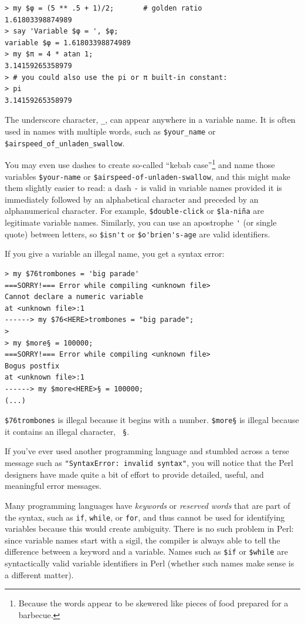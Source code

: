 \begin{verbatim}
> my $φ = (5 ** .5 + 1)/2;       # golden ratio
1.61803398874989
> say 'Variable $φ = ', $φ;
variable $φ = 1.61803398874989
> my $π = 4 * atan 1; 
3.14159265358979
> # you could also use the pi or π built-in constant:
> pi
3.14159265358979
\end{verbatim}

The underscore character, \verb"_", can appear anywhere in a variable name.
It is often used in names with multiple words, such as 
\verb"$your_name" or \verb"$airspeed_of_unladen_swallow". 

You may even use dashes to create so-called 
``kebab case''\footnote{Because the 
words appear to be skewered like pieces of food prepared for 
a barbecue.} and name those variables 
\verb"$your-name" or \verb"$airspeed-of-unladen-swallow", and this 
might make them slightly easier to read: a dash \verb'-' is 
valid in variable names provided it is immediately followed by an 
alphabetical character and preceded by an alphanumerical character. 
For example, \verb"$double-click" or \verb"$la-niña" are legitimate 
variable names. Similarly, you can use an apostrophe \verb"'" (or single 
quote) between letters, so \verb"$isn't" or \verb"$o'brien's-age" 
are valid identifiers.


If you give a variable an illegal name, you get a syntax error:

\begin{verbatim}
> my $76trombones = 'big parade'
===SORRY!=== Error while compiling <unknown file>
Cannot declare a numeric variable
at <unknown file>:1
------> my $76<HERE>trombones = "big parade";
>
> my $more§ = 100000;
===SORRY!=== Error while compiling <unknown file>
Bogus postfix
at <unknown file>:1
------> my $more<HERE>§ = 100000;
(...)
\end{verbatim}
%
{\tt \$76trombones} is illegal because it begins with a number.
{\tt \$more§} is illegal because it contains an illegal character, {\tt
§}. 

If you've ever used another programming language and stumbled 
across a terse message such as {\tt"SyntaxError: invalid syntax"}, 
you will notice that the Perl designers have made quite a bit 
of effort to provide detailed, useful,  and meaningful error 
messages. 

Many programming languages have \emph{keywords} or \emph{reserved 
words} that are part of the syntax, such as {\tt if}, {\tt while}, 
or {\tt for}, and thus cannot be used for identifying variables 
because this would create ambiguity. There is no such problem 
in Perl: since variable names start with a sigil, the compiler 
is always able to tell the difference between a keyword and a 
variable. Names such as {\tt \$if} or {\tt \$while} are 
syntactically valid variable identifiers in Perl (whether 
such names make sense is a different matter).



